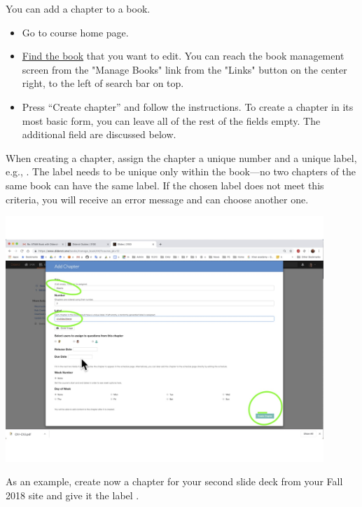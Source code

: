 \begin{gram}
\label{guide:chapter::create}
You can add a chapter to a book.  
\begin{itemize}
\item Go to course home page.
\item \href{guide::author::go-book-management}{Find the book} that you
  want to edit.  You can reach the book management screen from the
  "Manage Books" link from the "Links" button on the center right, to
  the left of search bar on top.

\item  Press ``Create chapter'' and follow the instructions.  To create a chapter in its most basic form, you can leave all of the rest of the fields empty.  The additional field are discussed below.
\end{itemize}
%

When creating a chapter, assign the chapter a unique number and a unique label, e.g., .  
%
The label needs to be unique only within the book---no two chapters of
the same book can have the same label.
%
If the chosen label does not meet this criteria, you will receive an error message and can choose another one.

\includegraphics[width=0.9\textwidth]{author/media/create-chapter.jpg}
\end{gram}

\begin{exercise}
As an example, create now a chapter for your second slide deck from
your Fall 2018 site and give it the label .
\end{exercise}


